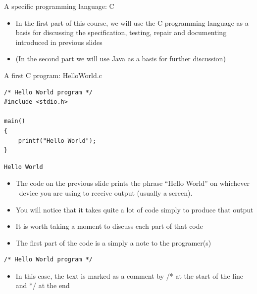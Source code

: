 \documentclass{beamer}
\begin{document}
\begin{frame}

A specific programming language: C

\begin{itemize}
\item In the first part of this course, we will use the C programming language as a basis for discussing the
specification, testing, repair and documenting introduced in previous slides
\item (In the second part we will use Java as a basis for further discussion)
\end{itemize}

\end{frame} 

\begin{frame}[fragile]

A first C program: HelloWorld.c

\begin{block}{}
\begin{lstlisting}
/* Hello World program */
#include <stdio.h>

main()
{
	printf("Hello World");
}
\end{lstlisting}
\end{block}

\begin{block}{}
\begin{lstlisting}
Hello World
\end{lstlisting}
\end{block}

\end{frame}


\begin{frame}
\begin{itemize}
\item The code on the previous slide prints the phrase ``Hello World'' on whichever \ device you are using to receive
output (usually a screen).
\item You will notice that it takes quite a lot of code simply to produce that output
\item It is worth taking a moment to discuss each part of that code
\end{itemize}
 
\end{frame}

\begin{frame}[fragile]
\begin{itemize}
\item The first part of the code is a simply a note to the programer(s) 
\end{itemize}
\begin{block}{}
\begin{lstlisting}
/* Hello World program */
\end{lstlisting}
\end{block}
\begin{itemize}
\item In this case, the text is marked as a comment by /* at the start of the line and */ at the end
\end{itemize}

\end{frame} 
\end{document}
